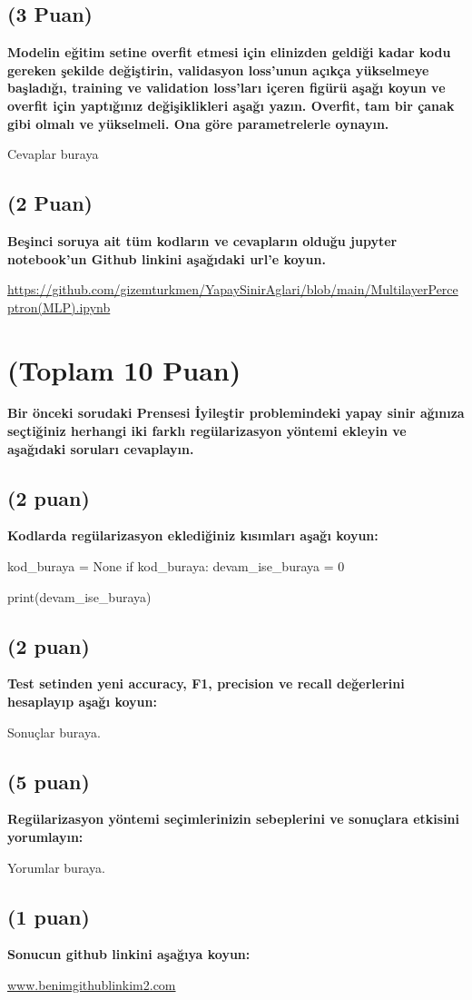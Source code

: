 \documentclass[11pt]{article}
\begin{document}
\subsection{(3 Puan)} \textbf{Modelin eğitim setine overfit etmesi için elinizden geldiği kadar kodu gereken şekilde değiştirin, validasyon loss'unun açıkça yükselmeye başladığı, training ve validation loss'ları içeren figürü aşağı koyun ve overfit için yaptığınız değişiklikleri aşağı yazın. Overfit, tam bir çanak gibi olmalı ve yükselmeli. Ona göre parametrelerle oynayın.}

Cevaplar buraya

\begin{comment}
\begin{figure}[ht!]
    \centering
    \texttt{[image: mypicturehere.png]}
    \caption{Buraya açıklama yazın}
    \label{fig:my_pic}
\end{figure}
\end{comment}

\subsection{(2 Puan)} \textbf{Beşinci soruya ait tüm kodların ve cevapların olduğu jupyter notebook'un Github linkini aşağıdaki url'e koyun.}

\url{https://github.com/gizemturkmen/YapaySinirAglari/blob/main/MultilayerPerceptron(MLP).ipynb}

\section{(Toplam 10 Puan)} \textbf{Bir önceki sorudaki Prensesi İyileştir problemindeki yapay sinir ağınıza seçtiğiniz herhangi iki farklı regülarizasyon yöntemi ekleyin ve aşağıdaki soruları cevaplayın.} 

\subsection{(2 puan)} \textbf{Kodlarda regülarizasyon eklediğiniz kısımları aşağı koyun:} 

\begin{python}
kod_buraya = None
if kod_buraya:
    devam_ise_buraya = 0

print(devam_ise_buraya)
\end{python}

\subsection{(2 puan)} \textbf{Test setinden yeni accuracy, F1, precision ve recall değerlerini hesaplayıp aşağı koyun:}

Sonuçlar buraya.

\subsection{(5 puan)} \textbf{Regülarizasyon yöntemi seçimlerinizin sebeplerini ve sonuçlara etkisini yorumlayın:}

Yorumlar buraya.

\subsection{(1 puan)} \textbf{Sonucun github linkini  aşağıya koyun:}

\url{www.benimgithublinkim2.com}
\end{document}
